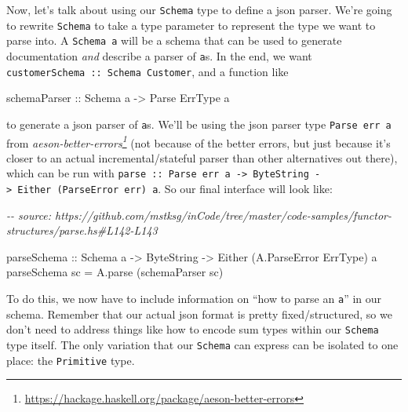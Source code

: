 \documentclass[]{article}
\newenvironment{Shaded}{}{}
\newcommand{\CommentTok}[1]{\textcolor[rgb]{0.38,0.63,0.69}{\textit{#1}}}
\newcommand{\DataTypeTok}[1]{\textcolor[rgb]{0.56,0.13,0.00}{#1}}
\newcommand{\NormalTok}[1]{#1}
\newcommand{\OtherTok}[1]{\textcolor[rgb]{0.00,0.44,0.13}{#1}}
\renewcommand{\href}[2]{#2\footnote{\url{#1}}}
\begin{document}
Now, let's talk about using our \texttt{Schema} type to define a json parser.
We're going to rewrite \texttt{Schema} to take a type parameter to represent the
type we want to parse into. A \texttt{Schema\ a} will be a schema that can be
used to generate documentation \emph{and} describe a parser of \texttt{a}s. In
the end, we want \texttt{customerSchema\ ::\ Schema\ Customer}, and a function
like

\begin{Shaded}
\begin{Highlighting}[]
\OtherTok{schemaParser ::} \DataTypeTok{Schema}\NormalTok{ a }\OtherTok{{-}>} \DataTypeTok{Parse} \DataTypeTok{ErrType}\NormalTok{ a}
\end{Highlighting}
\end{Shaded}

to generate a json parser of \texttt{a}s. We'll be using the json parser type
\texttt{Parse\ err\ a} from
\emph{\href{https://hackage.haskell.org/package/aeson-better-errors}{aeson-better-errors}}
(not because of the better errors, but just because it's closer to an actual
incremental/stateful parser than other alternatives out there), which can be run
with
\texttt{parse\ ::\ Parse\ err\ a\ -\textgreater{}\ ByteString\ -\textgreater{}\ Either\ (ParseError\ err)\ a}.
So our final interface will look like:

\begin{Shaded}
\begin{Highlighting}[]
\CommentTok{{-}{-} source: https://github.com/mstksg/inCode/tree/master/code{-}samples/functor{-}structures/parse.hs\#L142{-}L143}

\OtherTok{parseSchema ::} \DataTypeTok{Schema}\NormalTok{ a }\OtherTok{{-}>} \DataTypeTok{ByteString} \OtherTok{{-}>} \DataTypeTok{Either}\NormalTok{ (}\DataTypeTok{A.ParseError} \DataTypeTok{ErrType}\NormalTok{) a}
\NormalTok{parseSchema sc }\OtherTok{=}\NormalTok{ A.parse (schemaParser sc)}
\end{Highlighting}
\end{Shaded}

To do this, we now have to include information on ``how to parse an \texttt{a}''
in our schema. Remember that our actual json format is pretty fixed/structured,
so we don't need to address things like how to encode sum types within our
\texttt{Schema} type itself. The only variation that our \texttt{Schema} can
express can be isolated to one place: the \texttt{Primitive} type.
\end{document}
